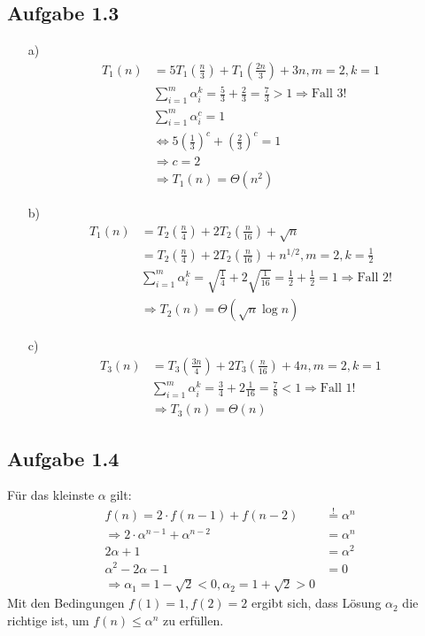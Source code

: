 \documentclass{article}
\begin{document}
    \subsection*{Aufgabe 1.3}
    \begin{enumerate}
        \item[a)]
        \begin{align*}
            T_1(n) &= 5 T_1\left(\frac{n}{3}\right) + T_1\left(\frac{2n}{3}\right) +3n, m=2, k=1 \\
            &\sum_{i=1}^{m} \alpha_i^k = \frac{5}{3} + \frac{2}{3} = \frac{7}{3} > 1 \Rightarrow \textrm{Fall 3!}\\
            &\sum_{i=1}^{m} \alpha_i^c = 1 \\
            &\Leftrightarrow 5\left(\frac{1}{3}\right)^c + \left(\frac{2}{3}\right)^c = 1\\
            &\Rightarrow c = 2 \\
            &\Rightarrow T_1(n) = \Theta(n^2)
        \end{align*}
        \item[b)]
        \begin{align*}
            T_1(n) &= T_2\left(\frac{n}{4}\right) + 2T_2\left(\frac{n}{16}\right) + \sqrt{n} \\
            &= T_2\left(\frac{n}{4}\right) + 2T_2\left(\frac{n}{16}\right) + n^{1/2}, m=2, k=\frac{1}{2}\\
            &\sum_{i=1}^{m} \alpha_i^k = \sqrt{\frac{1}{4}} + 2 \sqrt{\frac{1}{16}} = \frac{1}{2} + \frac{1}{2} = 1 \Rightarrow \textrm{Fall 2!}\\
            &\Rightarrow T_2(n) = \Theta(\sqrt{n}\log n)
        \end{align*}
        \item[c)]
        \begin{align*}
            T_3(n) &= T_3\left(\frac{3n}{4}\right) + 2 T_3\left(\frac{n}{16}\right) + 4n, m=2, k=1\\
            &\sum_{i=1}^{m} \alpha_i^k = \frac{3}{4} + 2\frac{1}{16} = \frac{7}{8} < 1 \Rightarrow \textrm{Fall 1!}\\
            &\Rightarrow T_3(n) = \Theta(n)
        \end{align*}
    \end{enumerate}


    \subsection*{Aufgabe 1.4}
    Für das kleinste $\alpha$ gilt: 
    \begin{align*}
        f(n) = 2\cdot f(n-1)+f(n-2) &\stackrel{!}{=} \alpha^n\\
        \Rightarrow 2\cdot \alpha^{n-1} + \alpha^{n-2} &= \alpha^n\\
        2 \alpha + 1 &= \alpha ^2 \\
        \alpha^2 - 2\alpha -1 &= 0 \\
        \Rightarrow \alpha_1 = 1 - \sqrt{2} < 0, \alpha_2 = 1 + \sqrt{2} > 0
    \end{align*}
    Mit den Bedingungen $f(1)=1, f(2)=2$ ergibt sich, dass Lösung $\alpha_2$ die richtige ist,
    um $f(n) \le \alpha^n$ zu erfüllen.
\end{document}
